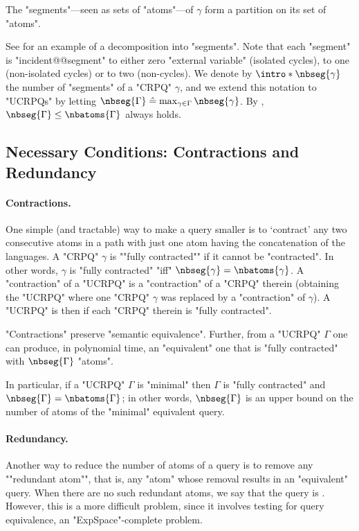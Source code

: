 \begin{fact}
	\AP\label{fact:partition-into-segments}
	The "segments"---seen as sets of "atoms"---of $\gamma$ form a partition on its set of "atoms".
\end{fact}

See  for an example of a decomposition into "segments".
Note that each "segment" is "incident@@segment" to either zero "external variable" (isolated cycles),
to one (non-isolated cycles) or to two (non-cycles).
We denote by \AP$\intro*\nbseg{\gamma}$ the number of "segments" of a "CRPQ" $\gamma$,
and we extend this notation to "UCRPQs" by letting $\nbseg{\Gamma} \defeq
\max_{\gamma \in \Gamma}{\nbseg{\gamma}}$. By , $\nbseg{\Gamma}\leq \nbatoms{\Gamma}$ always holds.

\subsection{Necessary Conditions: Contractions and Redundancy}

\paragraph{Contractions.}
One simple (and tractable) way to make a query smaller is to `contract' any two consecutive atoms in a path with just one atom having the concatenation of the languages.
A "CRPQ" $\gamma$ is \AP""fully contracted"" if it cannot be "contracted".
In other words, $\gamma$ is "fully contracted" "iff" $\nbseg{\gamma} = \nbatoms{\gamma}$.
A "contraction" of a "UCRPQ" is a "contraction" of a "CRPQ" therein (obtaining the "UCRPQ" where one "CRPQ" $\gamma$ was replaced by a "contraction" of $\gamma$). A "UCRPQ" is then  if each "CRPQ" therein is "fully contracted".

\begin{fact}
	\AP\label{fact:produce-fully-contracted}
	"Contractions" preserve "semantic equivalence". Further, from a "UCRPQ" $\Gamma$ one can produce, in polynomial time, an "equivalent" one that is "fully contracted" with $\nbseg{\Gamma}$ "atoms".
\end{fact}

In particular, if a "UCRPQ" $\Gamma$ is "minimal" then $\Gamma$ is "fully contracted" and $\nbseg{\Gamma} = \nbatoms{\Gamma}$; in other words, $\nbseg{\Gamma}$ is an upper bound on the number of atoms of the "minimal" equivalent query.

\paragraph{Redundancy.}
Another way to reduce the number of atoms of a query is to remove any \AP""redundant atom"", that is, any "atom" whose removal results in an "equivalent" query. 
When there are no such redundant atoms, we say that the query is .
However, this is a more difficult problem, since it involves testing for query equivalence, an "ExpSpace"-complete problem.

